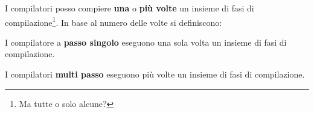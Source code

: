 I compilatori posso compiere \textbf{una} o \textbf{più volte} un insieme di
fasi di compilazione\footnote{Ma tutte o solo alcune?}. In base al numero delle
volte si definiscono:

\begin{definition}
I compilatore a \textbf{passo singolo} eseguono una sola volta un insieme di
fasi di compilazione.
\end{definition}

\begin{definition}
I compilatori \textbf{multi passo} eseguono più volte un insieme di fasi di
compilazione.
\end{definition}
